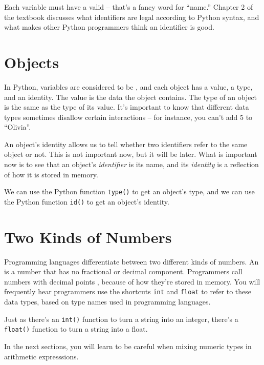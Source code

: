 Each variable must have a valid  -- that's a fancy word for ``name.''  Chapter 2 of the textbook discusses what identifiers are legal according to Python syntax, and what makes other Python programmers think an identifier is good.

\section{Objects}

In Python, variables are considered to be , and each object has a value, a type, and an identity.  The value is the data the object contains.  The type of an object is the same as the type of its value.  It's important to know that different data types sometimes disallow certain interactions -- for instance, you can't add 5 to ``Olivia''.

An object's identity allows us to tell whether two identifiers refer to the same object or not.  This is not important now, but it will be later.  What is important now is to see that an object's \textit{identifier} is its name, and its \textit{identity} is a reflection of how it is stored in memory.

We can use the Python function \texttt{type()} to get an object's type, and we can use the Python function \texttt{id()} to get an object's identity.

\section{Two Kinds of Numbers}

Programming languages differentiate between two different kinds of numbers.  An  is a number that has no fractional or decimal component.  Programmers call numbers with decimal points , because of how they're stored in memory.  You will frequently hear programmers use the shortcuts \texttt{int} and \texttt{float} to refer to these data types, based on type names used in programming languages.

Just as there's an \texttt{int()} function to turn a string into an integer, there's a \texttt{float()} function to turn a string into a float.

In the next sections, you will learn to be careful when mixing numeric types in arithmetic expresssions.

